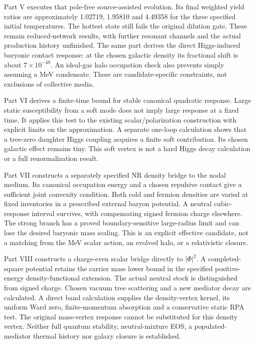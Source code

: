 \documentclass[11pt]{article}
\begin{document}
Part V executes that pole-free source-assisted evolution. Its final weighted
yield ratios are approximately 1.02719, 1.95810 and 4.49358 for the three
specified initial temperatures. The hottest state still fails the original
dilution gate. These remain reduced-network results, with further resonant
channels and the actual production history unfinished. The same part derives
the direct Higgs-induced baryonic contact response: at the chosen galactic
density its fractional shift is about $7\times10^{-48}$. An ideal-gas halo
occupation check also prevents simply assuming a MeV condensate. These are
candidate-specific constraints, not exclusions of collective media.

Part VI derives a finite-time bound for stable canonical quadratic response.
Large static susceptibility from a soft mode does not imply large response
at a fixed time. It applies this test to the existing scalar/polarization
construction with explicit limits on the approximation. A separate one-loop
calculation shows that a tree-zero daughter Higgs coupling acquires a finite
soft contribution. Its chosen galactic effect remains tiny. This soft vertex
is not a hard Higgs decay calculation or a full renormalization result.

Part VII constructs a separately specified NR density bridge to the nodal
medium. Its canonical occupation energy and a chosen repulsive contact
give a sufficient joint convexity condition. Both cold and fermion densities
are varied at fixed inventories in a prescribed external baryon potential.
A neutral cubic-response interval survives, with compensating signed fermion
charge elsewhere. The strong branch has a proved boundary-sensitive
large-radius limit and can lose the desired baryonic mass scaling. This is
an explicit effective candidate, not a matching from the MeV scalar action,
an evolved halo, or a relativistic closure.

Part VIII constructs a charge-even scalar bridge directly to $|\Phi|^2$.
A completed-square potential retains the carrier mass lower bound in the
specified positive-energy density-functional extension. The actual neutral
stock is distinguished from signed charge. Chosen vacuum tree scattering
and a new mediator decay are calculated. A direct band calculation supplies
the density-vertex kernel, its uniform Ward zero, finite-momentum absorption
and a conservative static RPA test. The original mass-vertex response cannot
be substituted for this density vertex. Neither full quantum stability,
neutral-mixture EOS, a populated-mediator thermal history nor galaxy closure
is established.
\end{document}
